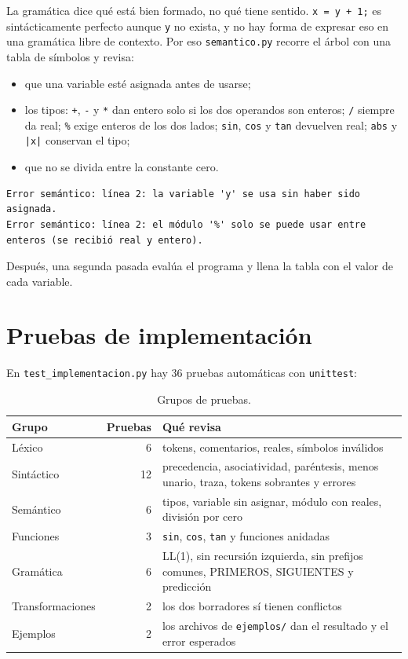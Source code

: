 \documentclass[12pt,letterpaper]{article}
\newcommand{\tk}[1]{\texttt{#1}}
\begin{document}
La gramática dice qué está bien formado, no qué tiene sentido. \tk{x = y + 1;} es sintácticamente perfecto aunque \tk{y} no exista, y no hay forma de expresar eso en una gramática libre de contexto. Por eso \tk{semantico.py} recorre el árbol con una tabla de símbolos y revisa:

\begin{itemize}
  \item que una variable esté asignada antes de usarse;
  \item los tipos: \tk{+}, \tk{-} y \tk{*} dan entero solo si los dos operandos son enteros; \tk{/} siempre da real; \tk{\%} exige enteros de los dos lados; \tk{sin}, \tk{cos} y \tk{tan} devuelven real; \tk{abs} y \tk{|x|} conservan el tipo;
  \item que no se divida entre la constante cero.
\end{itemize}

\begin{lstlisting}
Error semántico: línea 2: la variable 'y' se usa sin haber sido asignada.
Error semántico: línea 2: el módulo '%' solo se puede usar entre enteros (se recibió real y entero).
\end{lstlisting}

Después, una segunda pasada evalúa el programa y llena la tabla con el valor de cada variable.

\section{Pruebas de implementación}

En \tk{test\_implementacion.py} hay 36 pruebas automáticas con \tk{unittest}:

\begin{table}[H]
\centering
\caption{Grupos de pruebas.}
\small
\begin{tabular}{l r p{7.6cm}}
\toprule
Grupo & Pruebas & Qué revisa \\
\midrule
Léxico & 6 & tokens, comentarios, reales, símbolos inválidos \\
Sintáctico & 12 & precedencia, asociatividad, paréntesis, menos unario, traza, tokens sobrantes y errores \\
Semántico & 6 & tipos, variable sin asignar, módulo con reales, división por cero \\
Funciones & 3 & \tk{sin}, \tk{cos}, \tk{tan} y funciones anidadas \\
Gramática & 6 & LL(1), sin recursión izquierda, sin prefijos comunes, PRIMEROS, SIGUIENTES y predicción \\
Transformaciones & 2 & los dos borradores sí tienen conflictos \\
Ejemplos & 2 & los archivos de \tk{ejemplos/} dan el resultado y el error esperados \\
\bottomrule
\end{tabular}
\end{table}
\end{document}
